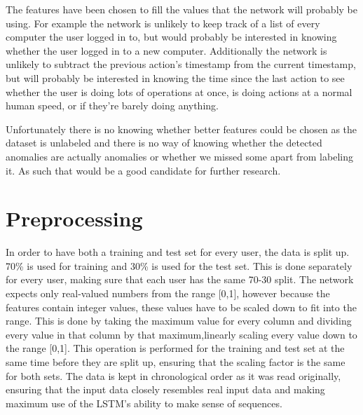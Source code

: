 The features have been chosen to fill the values that the network will probably be using. For example the network is unlikely to keep track of a list of every computer the user logged in to, but would probably be interested in knowing whether the user logged in to a new computer. Additionally the network is unlikely to subtract the previous action's timestamp from the current timestamp, but will probably be interested in knowing the time since the last action to see whether the user is doing lots of operations at once, is doing actions at a normal human speed, or if they're barely doing anything.

Unfortunately there is no knowing whether better features could be chosen as the dataset is unlabeled and there is no way of knowing whether the detected anomalies are actually anomalies or whether we missed some apart from labeling it. As such that would be a good candidate for further research.

\section{Preprocessing}
In order to have both a training and test set for every user, the data is split up. 70\% is used for training and 30\% is used for the test set. This is done separately for every user, making sure that each user has the same 70-30 split. The network expects only real-valued numbers from the range [0,1], however because the features contain integer values, these values have to be scaled down to fit into the range. This is done by taking the maximum value for every column and dividing every value in that column by that maximum,linearly scaling every value down to the range [0,1]. This operation is performed for the training and test set at the same time before they are split up, ensuring that the scaling factor is the same for both sets. The data is kept in chronological order as it was read originally, ensuring that the input data closely resembles real input data and making maximum use of the LSTM's ability to make sense of sequences.

